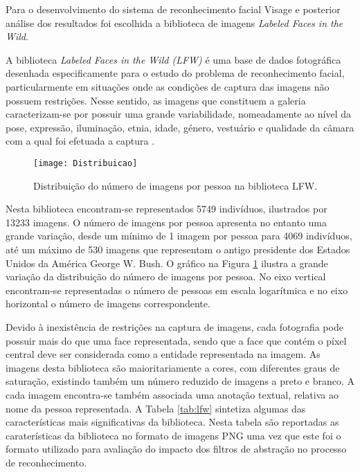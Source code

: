 Para o desenvolvimento do sistema de reconhecimento facial Visage e posterior análise dos resultados foi escolhida a biblioteca de imagens \textit{Labeled Faces in the Wild}.

A biblioteca \textit{Labeled Faces in the Wild (LFW)} é uma base de dados fotográfica desenhada especificamente para o estudo do problema de reconhecimento facial, particularmente em situações onde as condições de captura das imagens não possuem restrições. Nesse sentido, as imagens que constituem a galeria caracterizam-se por possuir uma grande variabilidade, nomeadamente ao nível da pose, expressão, iluminação, etnia, idade, género, vestuário e qualidade da câmara com a qual foi efetuada a captura \cite{Huang2007}.
\begin{figure}[ht]
  \begin{center}
    \leavevmode
    \texttt{[image: Distribuicao]}
    \caption{Distribuição do número de imagens por pessoa na biblioteca LFW.}
    \label{fig:distribuicaoLFW}
  \end{center}
\end{figure}
Nesta biblioteca encontram-se representados 5749 indivíduos, ilustrados por 13233 imagens. O número de imagens por pessoa apresenta no entanto uma grande variação, desde um mínimo de 1 imagem por pessoa para 4069 indivíduos, até um máximo de 530 imagens que representam o antigo presidente dos Estados Unidos da América George W. Bush. O gráfico na Figura \ref{fig:distribuicaoLFW} ilustra a grande variação da distribuição do número de imagens por pessoa. No eixo vertical encontram-se representadas o número de pessoas em escala logarítmica e no eixo horizontal o número de imagens correspondente.

Devido à inexistência de restrições na captura de imagens, cada fotografia pode possuir mais do que uma face representada, sendo que a face que contém o píxel central deve ser considerada como a entidade representada na imagem. As imagens desta biblioteca são maioritariamente a cores, com diferentes graus de saturação, existindo também um número reduzido de imagens a preto e branco. A cada imagem encontra-se também associada uma anotação textual, relativa ao nome da pessoa representada. A Tabela \ref{tab:lfw} sintetiza algumas das características mais significativas da biblioteca. Nesta tabela são reportadas as caraterísticas da biblioteca no formato de imagens PNG uma vez que este foi o formato utilizado para avaliação do impacto dos filtros de abstração no processo de reconhecimento.

